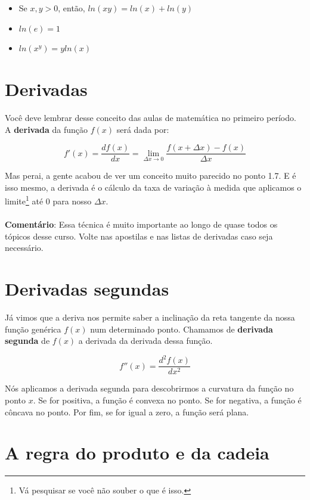 \documentclass[a4paper,11pt,oneside]{book}
\theoremstyle{definition}
\theoremstyle{break}
\begin{document}
\begin{itemize}
 \item Se $x,y > 0$, então, $ ln(xy) = ln(x) + ln(y) $
 \item $ ln(e) = 1 $
 \item $ ln(x^y) = y ln(x) $
\end{itemize}

\section*{Derivadas}

Você deve lembrar desse conceito das aulas de matemática no primeiro período. A \textbf{derivada} da função $f(x)$ será dada por:

$$ f'(x) = \frac{df(x)}{dx} = \lim_{\Delta x \to 0} \frac{f(x + \Delta x) - f(x)}{\Delta x} $$

Mas perai, a gente acabou de ver um conceito muito parecido no ponto 1.7. E é isso mesmo, a derivada é o cálculo da taxa de variação à medida que aplicamos o limite\footnote{Vá pesquisar se você não souber o que é isso.} até $0$ para nosso $\Delta x$.
\\~\\
\textbf{Comentário}: Essa técnica é muito importante ao longo de quase todos os tópicos desse curso. Volte nas apostilas e nas listas de derivadas caso seja necessário.

\section*{Derivadas segundas}

Já vimos que a deriva nos permite saber a inclinação da reta tangente da nossa função genérica $f(x)$ num determinado ponto. Chamamos de \textbf{derivada segunda} de $f(x)$ a derivada da derivada dessa função.

$$ f''(x) = \frac{d^2f(x)}{dx^2} $$

Nós aplicamos a derivada segunda para descobrirmos a curvatura da função no ponto $x$. Se for positiva, a função é convexa no ponto. Se for negativa, a função é côncava no ponto. Por fim, se for igual a zero, a função será plana.

\section*{A regra do produto e da cadeia}
\end{document}
